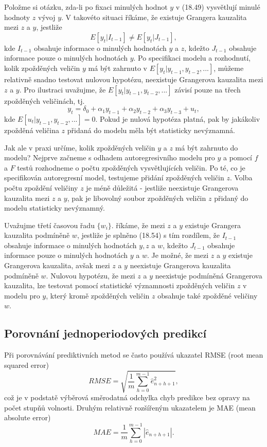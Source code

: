 Položme si otázku, zda-li po fixaci minulých hodnot $y$ v (18.49) vysvětlují minulé hodnoty $z$ 
vývoj $y$. V takovéto situaci říkáme, že existuje Grangera kauzalita mezi $z$ a $y$, jestliže
\begin{equation}
E[y_t|I_{t - 1}] \ne E[y_t|J_{t - 1}],
\end{equation}
kde $I_{t - 1}$ obsahuje informace o minulých hodnotách $y$ a $z$, kdežto $J_{t - 1}$ obsahuje informace pouze o 
minulých hodnotách $y$. Po specifikaci modelu a rozhodnutí, kolik zpožděných veličin $y$ má být zahrnuto v 
$E[y_t | y_{t - 1}, y_{t - 2}, ...]$, můžeme relativně snadno testovat nulovou hypotézu, neexistuje 
Grangerova kauzalita mezi $z$ a $y$. Pro ilustraci uvažujme, že $E[y_t | y_{t - 1}, y_{t - 2}, ...]$ závisí pouze na třech 
zpožděných veličinách, tj.
\begin{equation}
y_t = \delta_0 + \alpha_1 y_{t - 1} + \alpha_2 y_{t - 2} + \alpha_3 y_{t - 3} + u_t,
\end{equation}
kde $E[u_t | y_{t - 1}, y_{t - 2}, ...] = 0$. Pokud je nulová hypotéza platná, pak by jakákoliv zpožděná 
veličina $z$ přidaná do modelu měla být statisticky nevýznamná.

Jak ale v praxi určíme, kolik zpožděných veličin $y$ a $z$ má být zahrnuto do modelu? Nejprve začneme s 
odhadem autoregresivního modelu pro $y$ a pomocí $f$ a $F$ testů rozhodneme o počtu zpožděných vysvětlujících 
veličin. Po té, co je specifikován autoregresní model, testujeme přidání zpožděných veličin $z$. Volba 
počtu zpoždění veličiny $z$ je méně důležitá - jestliže neexistuje Grangerova kauzalita mezi $z$ a $y$, pak je 
libovolný soubor zpožděných veličin $z$ přidaný do modelu statisticky nevýznamný.

Uvažujme třetí časovou řadu $\{w_i\}$. říkáme, že mezi $z$ a $y$ existuje Grangera kauzalita podmíněně $w$, jestliže je 
splněno (18.54) s tím rozdílem, že $I_{t - 1}$ obsahuje informace o minulých hodnotách $y, z$ a $w$, kdežto 
$J_{t - 1}$ obsahuje informace pouze o minulých hodnotách $y$ a $w$. Je možné, že mezi $z$ a $y$ existuje Grangerova 
kauzalita, avšak mezi $z$ a $y$ neexistuje Grangerova kauzalita podmíněně $w$. Nulovou hypotézu, že 
mezi $z$ a $y$ neexistuje podmíněná Grangerova kauzalita, lze testovat pomocí statistické významnosti 
zpožděných veličin $z$ v modelu pro $y$, který kromě zpožděných veličin $z$ obsahuje také zpožděné veličiny $w$.

\subsection{Porovnání jednoperiodových predikcí}

Při porovnávání prediktivních metod se často používá ukazatel RMSE (root mean squared error)
\begin{equation}
RMSE = \sqrt{\frac{1}{m}\sum_{h = 0}^{m - 1} \hat{e}_{n + h + 1}^2},
\end{equation}
což je v podstatě výběrová směrodatná odchylka chyb predikce bez opravy na počet stupňů volnosti. Druhým 
relativně rozšířeným ukazatelem je MAE (mean absolute error)
\begin{equation}
MAE = \frac{1}{m}\sum_{h = 0}^{m - 1} |\hat{e}_{n + h + 1}|.
\end{equation}
